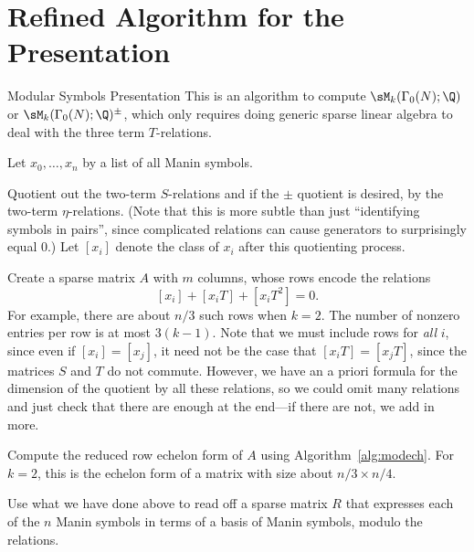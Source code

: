 \section{Refined Algorithm for the Presentation}
\begin{algorithm}{Modular Symbols Presentation}\label{alg:modsympresent}
This is an algorithm to compute $\sM_k(\Gamma_0(N);\Q)$ or 
$\sM_k(\Gamma_0(N);\Q)^{\pm}$, which
only requires doing generic sparse linear algebra to deal
with the three term $T$-relations. 
\begin{steps}
\item Let $x_0,\ldots, x_n$ by a list of all Manin symbols.
\item Quotient out the two-term $S$-relations and if the $\pm $
quotient is desired, by the two-term $\eta$-relations.
(Note that this is more subtle than 
just ``identifying symbols in pairs'',
since complicated relations can cause generators to surprisingly
equal $0$.)
       Let $[x_i]$ denote the
          class of $x_i$ after this quotienting process.
\item Create a sparse matrix $A$ with $m$ columns, whose rows 
      encode the relations
$$
                 [x_i] + [x_iT] + [x_iT^2] = 0.
$$
          For example, there are about $n/3$ such rows when 
          $k=2$.
          The number of nonzero entries per row is at most $3(k-1)$.
          Note that we must include rows for {\em all} $i$, since
          even if $[x_i] = [x_j]$, it need not be the case that
          $[x_i T] = [x_jT]$, since the matrices $S$ and $T$ do not commute.
          However, we have an a priori formula for the dimension
          of the quotient by all these relations, so we could omit
          many relations and just check that there are enough at the
          end---if there are not, we add in more.

        \item Compute the reduced row echelon form of $A$ using
          Algorithm~\ref{alg:modech}.  For $k=2$, this is the echelon
          form of a matrix with size about $n/3 \times n/4$.

 \item Use what we have done above to read off a sparse matrix $R$
          that expresses each of the $n$ Manin symbols in terms of
          a basis of Manin symbols, modulo the relations. 
        \end{steps}
      \end{algorithm}












